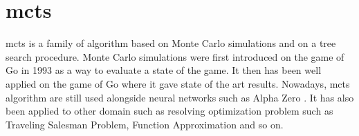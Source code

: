 \section{\acrlong{mcts}}%
\label{sec:mcts}

\Gls{mcts} is a family of algorithm based on Monte Carlo simulations and on a tree search procedure.
Monte Carlo simulations were first introduced on the game of Go in 1993 \cite{mcgo} as a way to evaluate a state of the game.
It then has been well applied on the game of Go where it gave state of the art results.
Nowadays, \gls{mcts} algorithm are still used alongside neural networks such as Alpha Zero \cite{alphazero}.
It has also been applied to other domain such as resolving optimization problem \cite{survey_mcts} such as Traveling Salesman Problem, Function Approximation and so on.

